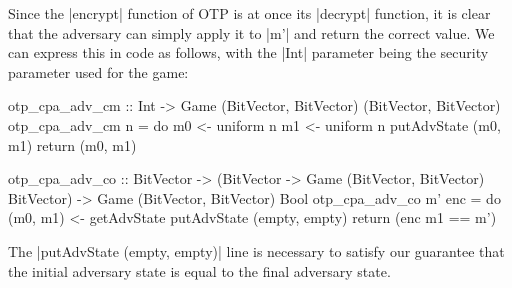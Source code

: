 Since the |encrypt| function of OTP is at once its |decrypt| function, it is clear that the adversary can simply apply
it to |m'| and return the correct value.  We can express this in code as follows, with the |Int| parameter being the
security parameter used for the game:
\begin{code}
    otp_cpa_adv_cm :: Int -> Game (BitVector, BitVector) (BitVector, BitVector)
    otp_cpa_adv_cm n = do
        m0 <- uniform n
        m1 <- uniform n
        putAdvState (m0, m1)
        return (m0, m1)

    otp_cpa_adv_co :: BitVector
                   -> (BitVector -> Game (BitVector, BitVector) BitVector)
                   -> Game (BitVector, BitVector) Bool
    otp_cpa_adv_co m' enc = do
        (m0, m1) <- getAdvState
        putAdvState (empty, empty)
        return (enc m1 == m')
\end{code}

The |putAdvState (empty, empty)| line is necessary to satisfy our guarantee that the initial adversary state is equal to
the final adversary state.

% 
% 
% 

